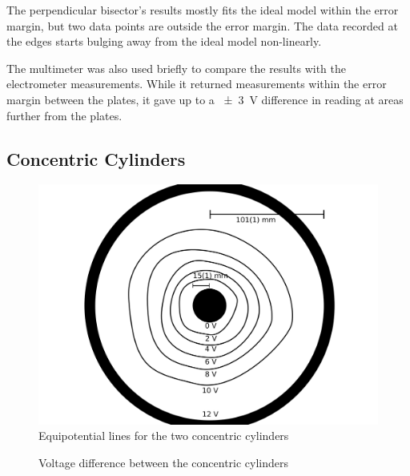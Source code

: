 \documentclass[a4paper]{scrartcl}
\begin{document}
The perpendicular bisector's results mostly fits the ideal model within the error margin, but two data points are outside the error margin. The data recorded at the edges starts bulging away from the ideal model non-linearly.

The multimeter was also used briefly to compare the results with the electrometer measurements. While it returned measurements within the error margin between the plates, it gave up to a \SI{\pm 3}{\volt} difference in reading at areas further from the plates.

\subsection{Concentric Cylinders}
\begin{figure}
    \centering
    \includegraphics[width = 15cm]{lab2_concentric_cylinders.png}
    \caption{Equipotential lines for the two concentric cylinders}
    \label{fig:concentric_cylinders}
\end{figure}
\begin{figure}
    \centering
    \caption{Voltage difference between the concentric cylinders}
    \label{fig:concentric_cylinders_voltage}
\end{figure}
\end{document}
